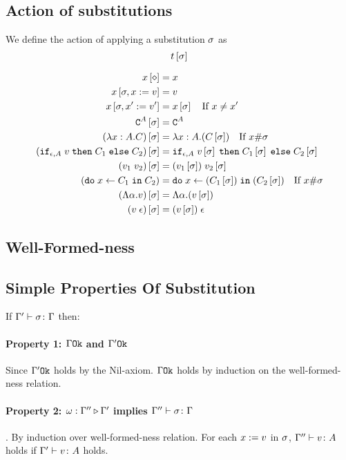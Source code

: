 {    \subsection{Action of substitutions}
        We define the action of applying a substitution $\sigma$ as 
        $$t\left[\sigma\right]$$

        
        \begin{align}
            x\left[\diamond\right] & = x \\
            x\left[\sigma,x:= v\right] & = v \\
            x\left[\sigma,x':= v'\right] & = x\left[\sigma\right]\quad\text{If }x \neq x'\\
            \texttt{C}^{A}\left[\sigma\right] & = \texttt{C}^{A} \\
            (\lambda x : A. C)\left[\sigma\right] &= \lambda x : A. (C\left[\sigma\right])\quad\text{If }x\#\sigma\\
            (\texttt{if}_{\epsilon, A}\; v\; \texttt{then}\; C_1 \;\texttt{else} \; C_2)\left[\sigma\right] &= \texttt{if}_{\epsilon, A}\; v\left[\sigma\right]\; \texttt{then}\; C_1\left[\sigma\right] \;\texttt{else} \; C_2\left[\sigma\right]\\
            (v_1\; v_2)\left[\sigma\right]&= (v_1\left[\sigma\right])\; v_2\left[\sigma\right]\\
            (\texttt{do}\; x \leftarrow C_1 \;\texttt{in}\; C_2)&= \texttt{do}\; x \leftarrow (C_1\left[\sigma\right]) \;\texttt{in}\; (C_2\left[\sigma\right])\quad\text{If } x\#\sigma\\
            (\Lambda \alpha. v)\left[\sigma\right] & = \Lambda \alpha. (v\left[\sigma\right])\\
            (v\;\epsilon)\left[\sigma\right] & = (v\left[\sigma\right])\;\epsilon\\
        \end{align}
    \subsection{Well-Formed-ness}
    
    \subsection{Simple Properties Of Substitution}
    If $\Gamma' \vdash \sigma \colon \Gamma$ then:


        \paragraph{Property 1: $\Gamma \texttt{Ok}$ and $\Gamma' \texttt{Ok}$}
         Since $\Gamma' \texttt{Ok}$ holds by the Nil-axiom. $\Gamma \texttt{Ok}$ holds by induction on the well-formed-ness relation.
        \paragraph{Property 2: $\omega : \Gamma'' \triangleright \Gamma'$ implies $\Gamma'' \vdash \sigma \colon \Gamma$}. 
        By induction over well-formed-ness relation. For each $x:= v$ in $\sigma$, $\Gamma'' \vdash v \colon A$ holds if $\Gamma' \vdash v \colon A$ holds.
}
